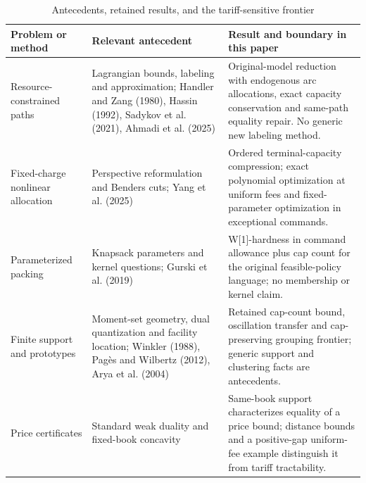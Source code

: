 \begin{table}[p]\centering
\caption{Antecedents, retained results, and the tariff-sensitive frontier}\label{tab:frontier60}
\begin{tabular}{p{}p{}p{}}\toprule
Problem or method & Relevant antecedent & Result and boundary in this paper\\\midrule
Resource-constrained paths & Lagrangian bounds, labeling and approximation; Handler and Zang (1980), Hassin (1992), Sadykov et al. (2021), Ahmadi et al. (2025) & Original-model reduction with endogenous arc allocations, exact capacity conservation and same-path equality repair. No generic new labeling method.\\[0.07in]
Fixed-charge nonlinear allocation & Perspective reformulation and Benders cuts; Yang et al. (2025) & Ordered terminal-capacity compression; exact polynomial optimization at uniform fees and fixed-parameter optimization in exceptional commands.\\[0.07in]
Parameterized packing & Knapsack parameters and kernel questions; Gurski et al. (2019) & W[1]-hardness in command allowance plus cap count for the original feasible-policy language; no membership or kernel claim.\\[0.07in]
Finite support and prototypes & Moment-set geometry, dual quantization and facility location; Winkler (1988), Pag\`es and Wilbertz (2012), Arya et al. (2004) & Retained cap-count bound, oscillation transfer and cap-preserving grouping frontier; generic support and clustering facts are antecedents.\\[0.07in]
Price certificates & Standard weak duality and fixed-book concavity & Same-book support characterizes equality of a price bound; distance bounds and a positive-gap uniform-fee example distinguish it from tariff tractability.\\\bottomrule
\end{tabular}
\end{table}
